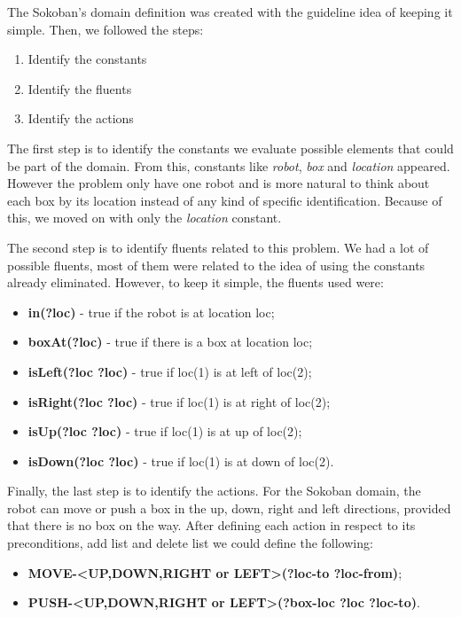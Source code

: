 \documentclass[10pt, letter]{article}
\begin{document}
The Sokoban's domain definition was created with the guideline idea of keeping it simple. Then, we followed the steps:

\begin{enumerate}
\item Identify the constants
\item Identify the fluents
\item Identify the actions
\end{enumerate} 

The first step is to identify the constants we evaluate possible elements that could be part of the domain. From this, constants like \textit{robot}, \textit{box} and \textit{location} appeared. However the problem only have one robot and is more natural to think about each box by its location instead of any kind of specific identification. Because of this, we moved on with only the \textit{location} constant.

The second step is to identify fluents related to this problem. We had a lot of possible fluents, most of them were related to the idea of using the constants already eliminated. However, to keep it simple, the fluents used were:

\begin{itemize}
\item \textbf{in(?loc)} - true if the robot is at location loc;
\item \textbf{boxAt(?loc)} - true if there is a box at location loc;
\item \textbf{isLeft(?loc ?loc)} - true if loc(1) is at left of loc(2);
\item \textbf{isRight(?loc ?loc)} - true if loc(1) is at right of loc(2);
\item \textbf{isUp(?loc ?loc)} - true if loc(1) is at up of loc(2);
\item \textbf{isDown(?loc ?loc)} - true if loc(1) is at down of loc(2).
\end{itemize} 

Finally, the last step is to identify the actions. For the Sokoban domain, the robot can move or push a box in the up, down, right and left directions, provided that there is no box on the way. After defining each action in respect to its preconditions, add list and delete list we could define the following:

\begin{itemize}
\item \textbf{MOVE-<UP,DOWN,RIGHT or LEFT>(?loc-to ?loc-from)};
\item \textbf{PUSH-<UP,DOWN,RIGHT or LEFT>(?box-loc ?loc ?loc-to)}.
\end{itemize} 
\end{document}
